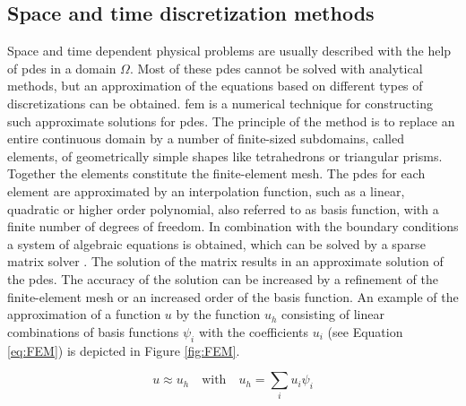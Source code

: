 \subsection{Space and time discretization methods}
\label{subsec:FEM}
Space and time dependent physical problems are usually described with the help of \glspl{pde} in a domain $\Omega$. Most of these \glspl{pde} cannot be solved with analytical methods, but an approximation of the equations based on different types of discretizations can be obtained. \Gls{fem} is a numerical technique for constructing such approximate solutions for \glspl{pde}. The principle of the method is to replace an entire continuous domain by a number of finite-sized subdomains, called elements, of geometrically simple shapes like tetrahedrons or triangular prisms. Together the elements constitute the finite-element mesh. The \glspl{pde} for each element are approximated by an interpolation function, such as a linear, quadratic or higher order polynomial, also referred to as basis function, with a finite number of degrees of freedom. In combination with the boundary conditions a  system of algebraic equations is obtained, which can be solved by a sparse matrix solver \cite{john2016finite}. The solution of the matrix results in an approximate solution of the \glspl{pde}. The accuracy of the solution can be increased by a refinement of the finite-element mesh or an increased order of the basis function. An example of the approximation of a function $u$ by the function $u_{h}$ consisting of linear combinations of basis functions $\psi_{i}$ with the coefficients $u_{i}$ (see Equation \ref{eq:FEM}) is depicted in Figure \ref{fig:FEM}. 

\begin{equation}
u\approx u_{h} \quad \textrm{with} \quad u_{h}=\sum_{i}u_{i}\psi_{i}
\label{eq:FEM}
\end{equation}

